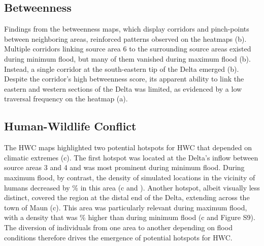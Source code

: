 \documentclass[../FinalThesis.tex]{subfiles}
\begin{document}
\subsection{Betweenness}

Findings from the betweenness maps, which display corridors and pinch-points
between neighboring areas, reinforced patterns observed on the heatmaps
(b). Multiple corridors linking source area 6 to the surrounding
source areas existed during minimum flood, but many of them vanished during
maximum flood (b). Instead, a single corridor at the south-eastern
tip of the Delta emerged (b). Despite the corridor's high
betweenness score, its apparent ability to link the eastern and western sections
of the Delta was limited, as evidenced by a low traversal frequency on the
heatmap (a).

\subsection{Human-Wildlife Conflict}

The HWC maps highlighted two potential hotspots for HWC that depended on
climatic extremes (c). The first hotspot was located at the
Delta's inflow between source areas 3 and 4 and was most prominent during
minimum flood. During maximum flood, by contrast, the density of simulated
locations in the vicinity of humans decreased by
\% in this area
(c and ). Another hotspot, albeit visually
less distinct, covered the region at the distal end of the Delta, extending
across the town of Maun (c). This area was particularly relevant
during maximum flood, with a density that was
\% higher than during minimum flood
(c and Figure S9). The diversion of individuals from one area to
another depending on flood conditions therefore drives the emergence of
potential hotspots for HWC.
\end{document}
